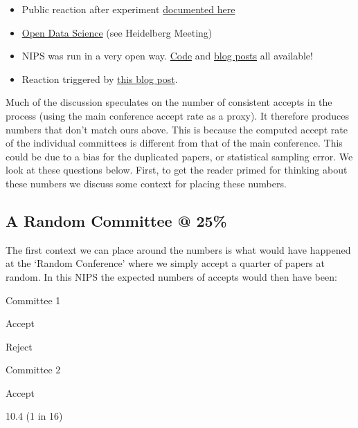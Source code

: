 \documentclass[a4paperpaper,]{article}
\begin{document}
\begin{itemize}
\item
  Public reaction after experiment
  \href{http://inverseprobability.com/2015/01/16/blogs-on-the-nips-experiment/}{documented
  here}
\item
  \href{http://inverseprobability.com/2014/07/01/open-data-science/}{Open
  Data Science} (see Heidelberg Meeting)
\item
  NIPS was run in a very open way.
  \href{https://github.com/sods/conference}{Code} and
  \href{http://inverseprobability.com/2014/12/16/the-nips-experiment/}{blog
  posts} all available!
\item
  Reaction triggered by
  \href{http://blog.mrtz.org/2014/12/15/the-nips-experiment.html}{this
  blog post}.
\end{itemize}

Much of the discussion speculates on the number of consistent accepts in
the process (using the main conference accept rate as a proxy). It
therefore produces numbers that don't match ours above. This is because
the computed accept rate of the individual committees is different from
that of the main conference. This could be due to a bias for the
duplicated papers, or statistical sampling error. We look at these
questions below. First, to get the reader primed for thinking about
these numbers we discuss some context for placing these numbers.

\hypertarget{a-random-committee-25}{%
\subsection{A Random Committee @ 25\%}\label{a-random-committee-25}}

\begin{flushright}
\end{flushright}

The first context we can place around the numbers is what would have
happened at the `Random Conference' where we simply accept a quarter of
papers at random. In this NIPS the expected numbers of accepts would
then have been:

Committee 1

Accept

Reject

Committee 2

Accept

10.4 (1 in 16)
\end{document}
